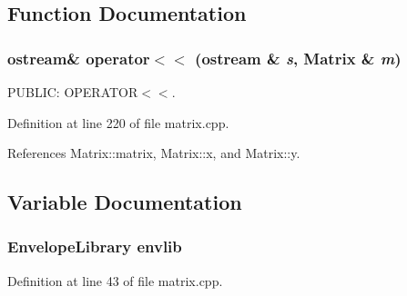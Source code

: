 \subsection{Function Documentation}
\subsubsection{\setlength{\rightskip}{0pt plus 5cm}ostream\& operator$<$$<$ (ostream \& {\em s}, {\bf Matrix} \& {\em m})}\label{matrix_8cpp_a1}


PUBLIC: OPERATOR$<$$<$. 

Definition at line 220 of file matrix.cpp.

References Matrix::matrix, Matrix::x, and Matrix::y.

\subsection{Variable Documentation}
\subsubsection{\setlength{\rightskip}{0pt plus 5cm}Envelope\-Library {\bf envlib}}\label{matrix_8cpp_a0}




Definition at line 43 of file matrix.cpp.